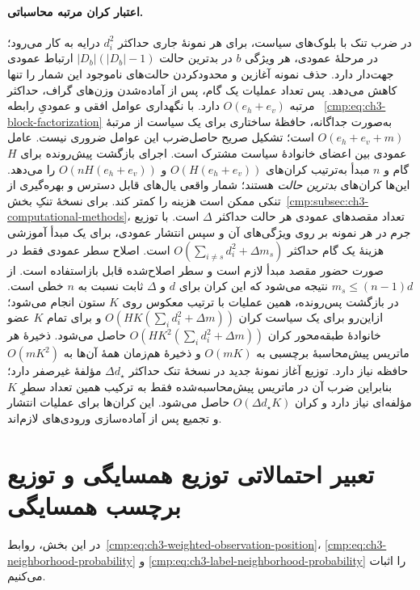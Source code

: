 \paragraph{اعتبار کران مرتبه محاسباتی.}
در ضرب تنک با بلوک‌های سیاست، برای هر نمونهٔ جاری
حداکثر $d_i^2$ درایه به کار می‌رود؛
در مرحلهٔ عمودی، هر ویژگی $b$ در بدترین حالت
$|D_b|(|D_b|-1)$ ارتباط عمودی جهت‌دار دارد.
حذف نمونه آغازین و محدودکردن حالت‌های ناموجود
این شمار را تنها کاهش می‌دهد. پس تعداد عملیات
یک گام، پس از آماده‌شدن وزن‌های گراف، حداکثر
مرتبه $O(e_h+e_v)$ دارد.
با نگهداری عوامل افقی و عمودیِ رابطه~
\eqref{cmp:eq:ch3-block-factorization} به‌صورت
جداگانه، حافظهٔ ساختاری برای یک سیاست از
مرتبهٔ $O(e_h+e_v+m)$ است؛ تشکیل صریح
حاصل‌ضرب این عوامل ضروری نیست. عامل عمودی
بین اعضای خانوادهٔ سیاست مشترک است.
اجرای بازگشت پیش‌رونده برای $H$ گام و $n$
مبدأ به‌ترتیب کران‌های
$O(H(e_h+e_v))$ و $O(nH(e_h+e_v))$
را می‌دهد. این‌ها کران‌های \emph{بدترین حالت}
هستند؛ شمار واقعی یال‌های قابل دسترس
و بهره‌گیری از تنکی ممکن است هزینه را کمتر کند.
برای نسخهٔ تنکِ بخش~\ref{cmp:subsec:ch3-computational-methods}،
تعداد مقصدهای عمودی هر حالت حداکثر $\Delta$ است.
با توزیع جرم در هر نمونه بر روی ویژگی‌های آن
و سپس انتشار عمودی، برای یک مبدأ آموزشی هزینهٔ
یک گام حداکثر
$O(\sum_{i\ne s}d_i^2+\Delta m_s)$ است.
اصلاح سطر عمودی فقط در صورت حضور مقصد مبدأ لازم
است و سطر اصلاح‌شده قابل بازاستفاده است.
از $m_s\le(n-1)d$ نتیجه می‌شود که این کران
برای $d$ و $\Delta$ ثابت نسبت به $n$ خطی است.
در بازگشت پس‌رونده، همین عملیات با ترتیب معکوس
روی $K$ ستون انجام می‌شود؛ ازاین‌رو برای یک
سیاست کران
$O(HK(\sum_i d_i^2+\Delta m))$
و برای تمام $K$ عضو خانوادهٔ طبقه‌محور کران
$O(HK^2(\sum_i d_i^2+\Delta m))$
حاصل می‌شود. ذخیرهٔ هر ماتریس پیش‌محاسبهٔ
برچسبی به $O(mK)$ و ذخیرهٔ هم‌زمان همهٔ آن‌ها
به $O(mK^2)$ حافظه نیاز دارد.
توزیع آغاز نمونهٔ جدید در نسخهٔ تنک حداکثر
$\Delta d_\star$ مؤلفهٔ غیرصفر دارد؛ بنابراین
ضرب آن در ماتریس پیش‌محاسبه‌شده فقط به ترکیب
همین تعداد سطرِ $K$مؤلفه‌ای نیاز دارد و کران
$O(\Delta d_\star K)$ حاصل می‌شود.
این کران‌ها برای عملیات انتشار و تجمیع
پس از آماده‌سازی ورودی‌های لازم‌اند.


\section{تعبیر احتمالاتی توزیع همسایگی و توزیع برچسب همسایگی}
\label{app:ch3-neighborhood-probability-proof}
در این بخش، روابط~\eqref{cmp:eq:ch3-weighted-observation-position}،
\eqref{cmp:eq:ch3-neighborhood-probability} و
\eqref{cmp:eq:ch3-label-neighborhood-probability} را اثبات می‌کنیم.

